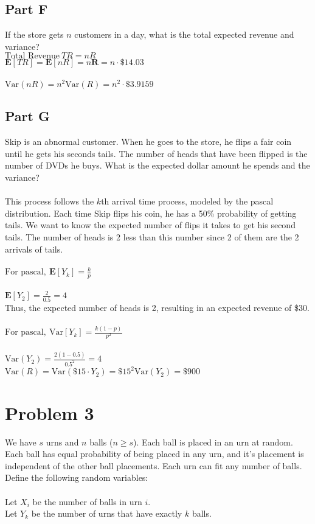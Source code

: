 \documentclass{amsart}
\begin{document}
	\subsection{Part F}
	If the store gets $n$ customers in a day, what is the total expected revenue and variance?\\
	$\text{Total Revenue}~ TR = nR$\\
	$\mathbf{E}[TR] = \mathbf{E}[nR] = n\mathbf{R} = n\cdot\$14.03$\\\\
	$\text{Var}(nR) = n^2\text{Var}(R) = n^2\cdot \$3.9159$\\
	\subsection{Part G}
	Skip is an abnormal customer. When he goes to the store, he flips a fair coin until he gets his seconds tails. The number of heads that have been flipped is the number of DVDs he buys. What is the expected dollar amount he spends and the variance?\\
	\\
	This process follows the $k$th arrival time process, modeled by the pascal distribution. Each time Skip flips his coin, he has a 50\% probability of getting tails. We want to know the expected number of flips it takes to get his second tails. The number of heads is 2 less than this number since 2 of them are the 2 arrivals of tails.
	\\\\
	$\text{For pascal},~\mathbf{E}[Y_k] = \frac{k}{p}$\\
	\\
	$\mathbf{E}[Y_2] = \frac{2}{0.5} = 4$\\
	Thus, the expected number of heads is 2, resulting in an expected revenue of \$30.
	\\\\
	$\text{For pascal},~\text{Var}[Y_k] = \frac{k(1-p)}{p^2}$\\
	\\
	$\text{Var}(Y_2) = \frac{2(1-0.5)}{0.5^2}=4$\\
	$\text{Var}(R) = \text{Var}(\$15\cdot Y_2) = \$15^2\text{Var}(Y_2) = \$900$
	\pagebreak
	\section{Problem 3}
	We have $s$ urns and $n$ balls ($n \geq s$). Each ball is placed in an urn at random. Each ball has equal probability of being placed in any urn, and it's placement is independent of the other ball placements. Each urn can fit any number of balls.\\
	Define the following random variables:\\\\
	Let $X_i$ be the number of balls in urn $i$.\\
	Let $Y_k$ be the number of urns that have exactly $k$ balls.\\
\end{document}
